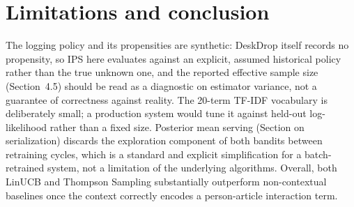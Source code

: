 \section{Limitations and conclusion}
The logging policy and its propensities are synthetic: DeskDrop itself
records no propensity, so IPS here evaluates against an explicit, assumed
historical policy rather than the true unknown one, and the reported
effective sample size (Section~4.5) should be read as a diagnostic on
estimator variance, not a guarantee of correctness against reality. The
20-term TF-IDF vocabulary is deliberately small; a production system would
tune it against held-out log-likelihood rather than a fixed size. Posterior
mean serving (Section on serialization) discards the exploration component
of both bandits between retraining cycles, which is a standard and explicit
simplification for a batch-retrained system, not a limitation of the
underlying algorithms. Overall, both LinUCB and Thompson Sampling
substantially outperform non-contextual baselines once the context
correctly encodes a person-article interaction term.
